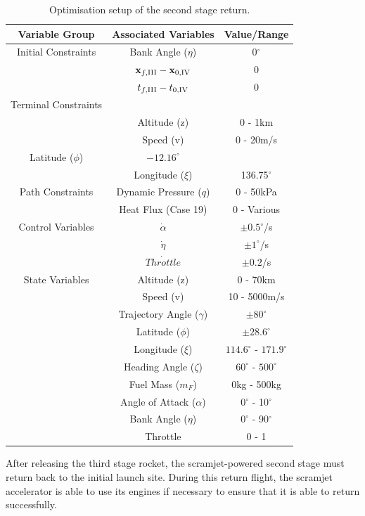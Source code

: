 \begin{table}[ht]
	\centering
	\begin{tabular}{|c|c|c|}
		\hline \textbf{Variable Group}  & \textbf{Associated Variables} & \textbf{Value/Range}\\
		\hline Initial Constraints  & Bank Angle ($\eta$)& 0$^\circ$ \\ 
		& $\textbf{x}_{f,\textrm{\rom{3}}} - \textbf{x}_{0,\textrm{\rom{4}}}$ & 0\\ & $t_{f,\textrm{\rom{3}}} - t_{0,\textrm{\rom{4}}}$ & 0\\
		\hline Terminal Constraints& & \\ & Altitude (z) & 0 - 1km \\ & Speed (v) & 0 - 20m/s \\ Latitude ($\phi$)  & $-12.16^\circ$ \\& Longitude ($\xi$) & 136.75$^\circ$\\
		\hline Path Constraints & Dynamic Pressure ($q$)& 0 - 50kPa\\ & Heat Flux (Case 19) & 0 - Various\\ 
		\hline Control Variables & $\dot{\alpha}$ &  $\pm0.5^\circ$/s\\  & $\dot{\eta}$ &  $\pm1^\circ$/s\\ & $\dot{Throttle}$& $\pm0.2$/s\\
		\hline State Variables& Altitude (z) & 0 - 70km\\ & Speed (v)& 10 - 5000m/s\\ & Trajectory Angle ($\gamma$)& $\pm80^\circ$\\    & Latitude ($\phi$) &$\pm28.6^\circ$ \\  & Longitude ($\xi$)& $114.6^\circ$ - $171.9^\circ$\\   & Heading Angle ($\zeta$)& $60^\circ$ - $500^\circ$ \\  & Fuel Mass ($m_F$)& 0kg - 500kg\\  & Angle of Attack ($\alpha$)&  0$^\circ$ - 10$^\circ$\\  & Bank Angle ($\eta$)& $0^\circ$ - 90$^\circ$\\  & Throttle & 0 - 1 \\ 
		\hline 
	\end{tabular} 
	\caption{Optimisation setup of the second stage return.}
	
\end{table}
\noindent
After releasing the third stage rocket, the scramjet-powered second stage must return back to the initial launch site. During this return flight, the scramjet accelerator is able to use its engines if necessary to ensure that it is able to return successfully. 
